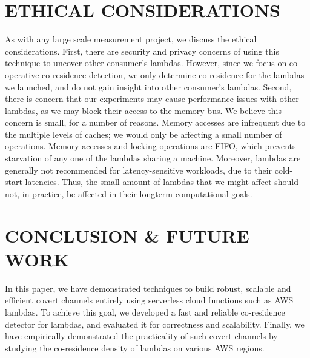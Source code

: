 
\section{ETHICAL CONSIDERATIONS}
As with any large scale measurement project, we discuss the ethical
considerations. First, there are security and privacy concerns of using this
technique to uncover other consumer's lambdas. However, since we focus on
co-operative co-residence detection, we only determine co-residence for the
lambdas we launched, and do not gain insight into other consumer's lambdas.
Second, there is concern that our experiments may cause performance issues with
other lambdas, as we may block their access to the memory bus. We believe this
concern is small, for a number of reasons. Memory accesses are infrequent due to
the multiple levels of caches; we would only be affecting a small number of
operations. Memory accesses and locking operations are FIFO, which prevents
starvation of any one of the lambdas sharing a machine. Moreover, lambdas are
generally not recommended for latency-sensitive workloads, due to their
cold-start latencies. Thus, the small amount of lambdas that we might affect
should not, in practice, be affected in their longterm computational goals. 


\section{CONCLUSION \& FUTURE WORK}
\label{sec:conclusion}
In this paper, we have demonstrated techniques to build robust, scalable and 
efficient covert channels entirely using serverless cloud functions such as 
AWS lambdas. To achieve this goal, we developed a fast and reliable co-residence 
detector for lambdas, and evaluated it for correctness and scalability.
Finally, we have empirically demonstrated the practicality of such covert 
channels by studying the co-residence density of lambdas on various AWS regions. 


